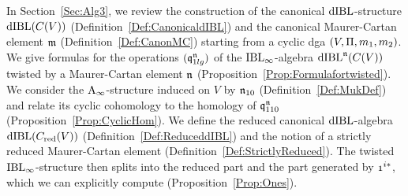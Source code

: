 \documentclass[\MainFolder/Text.tex]{subfiles}
\begin{document}
In Section~\ref{Sec:Alg3}, we review the construction of the canonical $\mathrm{dIBL}$-structure $\mathrm{dIBL}(C(V))$ (Definition~\ref{Def:CanonicaldIBL}) and the canonical Maurer-Cartan element $\mathfrak{m}$ (Definition~\ref{Def:CanonMC}) starting from a cyclic dga $(V,\Pi,m_1,m_2)$. We give formulas for the operations $(\mathfrak{q}_{1lg}^{\mathfrak{n}})$ of the $\mathrm{IBL}_\infty$-algebra $\mathrm{dIBL}^{\mathfrak{n}}(C(V))$ twisted by a Maurer-Cartan element $\mathfrak{n}$ (Proposition~\ref{Prop:Formulafortwisted}). We consider the $\mathrm{A}_\infty$-structure induced on $V$ by $\mathfrak{n}_{10}$ (Definition~\ref{Def:MukDef}) and relate its cyclic cohomology to the homology of $\mathfrak{q}_{110}^{\mathfrak{n}}$ (Proposition~\ref{Prop:CyclicHom}). We define the reduced canonical $\mathrm{dIBL}$-algebra $\mathrm{dIBL}(C_{\mathrm{red}}(V))$ (Definition~\ref{Def:ReduceddIBL}) and the notion of a strictly reduced Maurer-Cartan element (Definition~\ref{Def:StrictlyReduced}). The twisted $\mathrm{IBL}_\infty$-structure then splits into the reduced part and the part generated by $\NOne^{i*}$, which we can explicitly compute (Proposition~\ref{Prop:Ones}).
\end{document}
